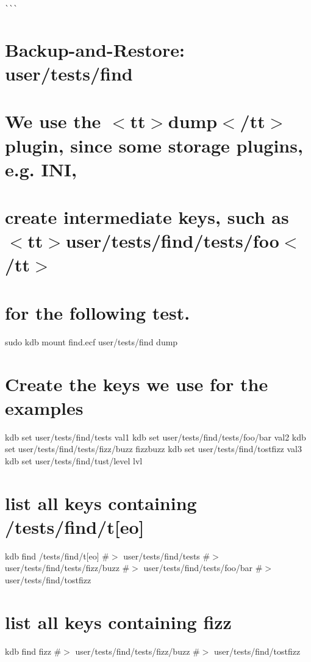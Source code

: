 \`{}\`{}\`{} \hypertarget{doc_help_kdb-find_md_autotoc_md1683}{}\section{Backup-\/and-\/\+Restore\+: user/tests/find}\label{doc_help_kdb-find_md_autotoc_md1683}
\hypertarget{doc_help_kdb-find_md_autotoc_md1684}{}\section{We use the $<$tt$>$dump$<$/tt$>$ plugin, since some storage plugins, e.\+g. I\+N\+I,}\label{doc_help_kdb-find_md_autotoc_md1684}
\hypertarget{doc_help_kdb-find_md_autotoc_md1685}{}\section{create intermediate keys, such as $<$tt$>$user/tests/find/tests/foo$<$/tt$>$}\label{doc_help_kdb-find_md_autotoc_md1685}
\hypertarget{doc_help_kdb-find_md_autotoc_md1686}{}\section{for the following test.}\label{doc_help_kdb-find_md_autotoc_md1686}
sudo kdb mount find.\+ecf user/tests/find dump\hypertarget{doc_help_kdb-find_md_autotoc_md1687}{}\section{Create the keys we use for the examples}\label{doc_help_kdb-find_md_autotoc_md1687}
kdb set user/tests/find/tests val1 kdb set user/tests/find/tests/foo/bar val2 kdb set user/tests/find/tests/fizz/buzz fizzbuzz kdb set user/tests/find/tostfizz val3 kdb set user/tests/find/tust/level lvl\hypertarget{doc_help_kdb-find_md_autotoc_md1688}{}\section{list all keys containing /tests/find/t\mbox{[}eo\mbox{]}}\label{doc_help_kdb-find_md_autotoc_md1688}
kdb find \textquotesingle{}/tests/find/t\mbox{[}eo\mbox{]}\textquotesingle{} \#$>$ user/tests/find/tests \#$>$ user/tests/find/tests/fizz/buzz \#$>$ user/tests/find/tests/foo/bar \#$>$ user/tests/find/tostfizz\hypertarget{doc_help_kdb-find_md_autotoc_md1689}{}\section{list all keys containing fizz}\label{doc_help_kdb-find_md_autotoc_md1689}
kdb find \textquotesingle{}fizz\textquotesingle{} \#$>$ user/tests/find/tests/fizz/buzz \#$>$ user/tests/find/tostfizz

